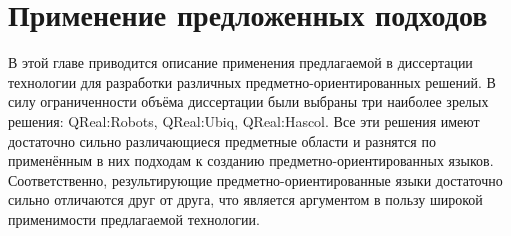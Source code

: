 \chapter{Применение предложенных подходов}

В этой главе приводится описание применения предлагаемой в диссертации технологии 
для разработки различных предметно-ориентированных решений. В силу ограниченности 
объёма диссертации были выбраны три наиболее зрелых решения: QReal:Robots, QReal:Ubiq,
QReal:Hascol. Все эти решения имеют достаточно сильно различающиеся предметные области 
и разнятся по применённым в них подходам к созданию предметно-ориентированных языков. 
Соответственно, результирующие предметно-ориентированные языки достаточно сильно отличаются 
друг от друга, что является аргументом в пользу широкой применимости предлагаемой технологии.



